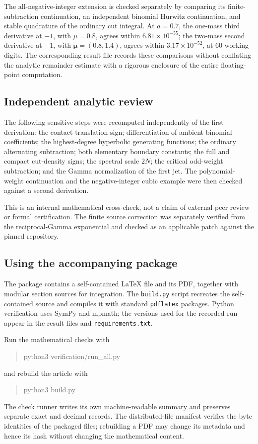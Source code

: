 \documentclass[11pt,letterpaper]{article}
\numberwithin{equation}{section}
\theoremstyle{definition}
\theoremstyle{remark}
\newcommand{\src}[1]{\nolinkurl{#1}}
\begin{document}
The all-negative-integer extension is checked separately by comparing
its finite-subtraction continuation, an independent binomial Hurwitz
continuation, and stable quadrature of the ordinary cut integral.
At \(a=0.7\), the one-mass third derivative at \(-1\), with
\(\mu=0.8\), agrees within \(6.81\times10^{-55}\); the two-mass
second derivative at \(-1\), with \(\boldsymbol\mu=(0.8,1.4)\),
agrees within \(3.17\times10^{-52}\), at 60 working digits.
The corresponding result file records these comparisons without
conflating the analytic remainder estimate with a rigorous enclosure
of the entire floating-point computation.

\subsection{Independent analytic review}

The following sensitive steps were recomputed independently of the first
derivation: the contact translation sign; differentiation of ambient
binomial coefficients; the highest-degree hyperbolic generating functions;
the ordinary alternating subtraction; both elementary boundary constants;
the full and compact cut-density signs; the spectral scale \(2N\); the
critical odd-weight subtraction; and the Gamma normalization of the first
jet. The polynomial-weight continuation and the negative-integer cubic
example were then checked against a second derivation.

This is an internal mathematical cross-check, not a claim of external peer
review or formal certification. The finite source correction was separately
verified from the reciprocal-Gamma exponential and checked as an applicable
patch against the pinned repository.

\subsection{Using the accompanying package}

The package contains a self-contained \LaTeX{} file and its PDF, together
with modular section sources for integration. The \src{build.py} script
recreates the self-contained source and compiles it with standard
\src{pdflatex} packages. Python verification uses SymPy and mpmath; the
versions used for the recorded run appear in the result files and
\src{requirements.txt}.

Run the mathematical checks with
\begin{quote}\ttfamily
 python3 verification/run\_all.py
\end{quote}
and rebuild the article with
\begin{quote}\ttfamily
 python3 build.py
\end{quote}
The check runner writes its own machine-readable summary and preserves
separate exact and decimal records. The distributed-file manifest verifies
the byte identities of the packaged files; rebuilding a PDF may change
its metadata and hence its hash without changing the mathematical content.
\end{document}
